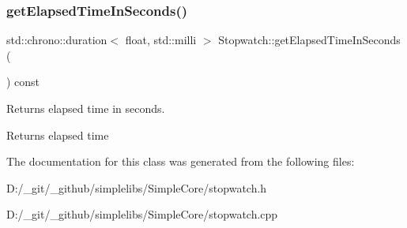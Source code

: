 \subsubsection{\texorpdfstring{getElapsedTimeInSeconds()}{getElapsedTimeInSeconds()}}
{\footnotesize\ttfamily std\+::chrono\+::duration$<$ float, std\+::milli $>$ Stopwatch\+::get\+Elapsed\+Time\+In\+Seconds (\begin{DoxyParamCaption}{ }\end{DoxyParamCaption}) const}



Returns elapsed time in seconds. 

\begin{DoxyReturn}{Returns}
elapsed time 
\end{DoxyReturn}


The documentation for this class was generated from the following files\+:\begin{DoxyCompactItemize}
\item 
D\+:/\+\_\+git/\+\_\+github/simplelibs/\+Simple\+Core/stopwatch.\+h\item 
D\+:/\+\_\+git/\+\_\+github/simplelibs/\+Simple\+Core/stopwatch.\+cpp\end{DoxyCompactItemize}
